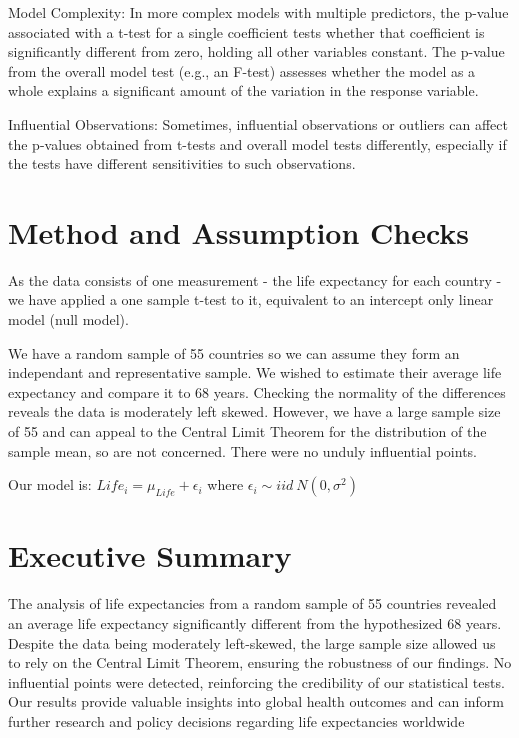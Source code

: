 \documentclass[
]{article}
\begin{document}
Model Complexity: In more complex models with multiple predictors, the
p-value associated with a t-test for a single coefficient tests whether
that coefficient is significantly different from zero, holding all other
variables constant. The p-value from the overall model test (e.g., an
F-test) assesses whether the model as a whole explains a significant
amount of the variation in the response variable.

Influential Observations: Sometimes, influential observations or
outliers can affect the p-values obtained from t-tests and overall model
tests differently, especially if the tests have different sensitivities
to such observations.

\section{Method and Assumption
Checks}\label{method-and-assumption-checks-1}

As the data consists of one measurement - the life expectancy for each
country - we have applied a one sample t-test to it, equivalent to an
intercept only linear model (null model).

We have a random sample of 55 countries so we can assume they form an
independant and representative sample. We wished to estimate their
average life expectancy and compare it to 68 years. Checking the
normality of the differences reveals the data is moderately left skewed.
However, we have a large sample size of 55 and can appeal to the Central
Limit Theorem for the distribution of the sample mean, so are not
concerned. There were no unduly influential points.

Our model is: \(Life_i = \mu_{Life} + \epsilon_i\) where
\(\epsilon_i \sim iid ~ N(0,\sigma^2)\)

\section{Executive Summary}\label{executive-summary-1}

The analysis of life expectancies from a random sample of 55 countries
revealed an average life expectancy significantly different from the
hypothesized 68 years. Despite the data being moderately left-skewed,
the large sample size allowed us to rely on the Central Limit Theorem,
ensuring the robustness of our findings. No influential points were
detected, reinforcing the credibility of our statistical tests. Our
results provide valuable insights into global health outcomes and can
inform further research and policy decisions regarding life expectancies
worldwide
\end{document}
